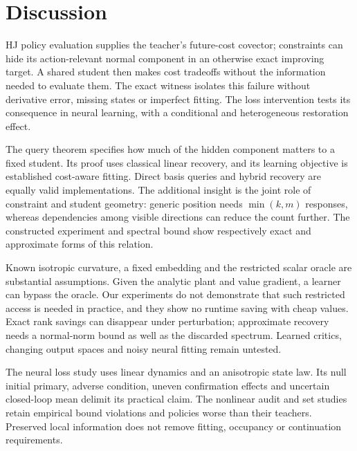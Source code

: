 \section{Discussion}
HJ policy evaluation supplies the teacher's future-cost covector;
constraints can hide its action-relevant normal component in an
otherwise exact improving target. A shared student then makes cost
tradeoffs without the information needed to evaluate them. The exact
witness isolates this failure without derivative error, missing states
or imperfect fitting. The loss intervention tests its consequence in
neural learning, with a conditional and heterogeneous restoration effect.

The query theorem specifies how much of the hidden component matters
to a fixed student. Its proof uses classical linear recovery, and its
learning objective is established cost-aware fitting. Direct basis
queries and hybrid recovery are equally valid implementations. The
additional insight is the joint role of constraint and student geometry:
generic position needs $\min(k,m)$ responses, whereas dependencies
among visible directions can reduce the count further. The constructed
experiment and spectral bound show respectively exact and approximate
forms of this relation.

Known isotropic curvature, a fixed embedding and the restricted scalar
oracle are substantial assumptions. Given the analytic plant and value
gradient, a learner can bypass the oracle. Our experiments do not
demonstrate that such restricted access is needed in practice, and
they show no runtime saving with cheap values. Exact rank savings can
disappear under perturbation; approximate recovery needs a normal-norm
bound as well as the discarded spectrum. Learned critics, changing
output spaces and noisy neural fitting remain untested.

The neural loss study uses linear dynamics and an anisotropic state
law. Its null initial primary, adverse condition, uneven confirmation
effects and uncertain closed-loop mean delimit its practical claim.
The nonlinear audit and set studies retain empirical bound violations
and policies worse than their teachers. Preserved local information
does not remove fitting, occupancy or continuation requirements.
